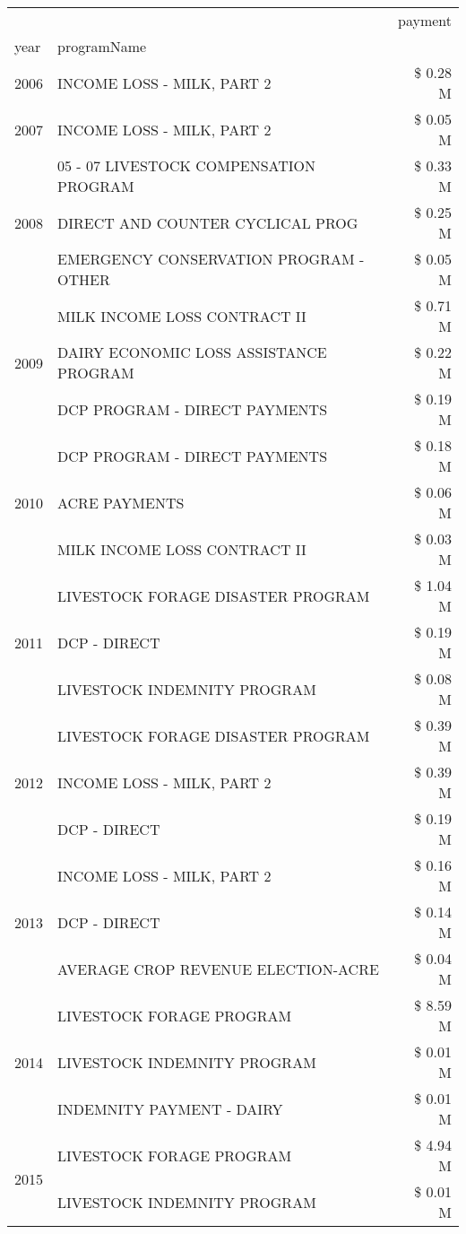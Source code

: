 \begin{tabular}{llr}
\toprule
 &  & payment \\
year & programName &  \\
\midrule
2006 & INCOME LOSS - MILK, PART 2 & \$ 0.28 M \\
\cline{1-3}
2007 & INCOME LOSS - MILK, PART 2 & \$ 0.05 M \\
\cline{1-3}
\multirow[t]{3}{*}{2008} & 05 - 07 LIVESTOCK COMPENSATION PROGRAM & \$ 0.33 M \\
 & DIRECT AND COUNTER CYCLICAL PROG & \$ 0.25 M \\
 & EMERGENCY CONSERVATION PROGRAM - OTHER & \$ 0.05 M \\
\cline{1-3}
\multirow[t]{3}{*}{2009} & MILK INCOME LOSS CONTRACT II & \$ 0.71 M \\
 & DAIRY ECONOMIC LOSS ASSISTANCE PROGRAM & \$ 0.22 M \\
 & DCP PROGRAM - DIRECT PAYMENTS & \$ 0.19 M \\
\cline{1-3}
\multirow[t]{3}{*}{2010} & DCP PROGRAM - DIRECT PAYMENTS & \$ 0.18 M \\
 & ACRE PAYMENTS & \$ 0.06 M \\
 & MILK INCOME LOSS CONTRACT II & \$ 0.03 M \\
\cline{1-3}
\multirow[t]{3}{*}{2011} & LIVESTOCK FORAGE DISASTER PROGRAM & \$ 1.04 M \\
 & DCP - DIRECT & \$ 0.19 M \\
 & LIVESTOCK INDEMNITY PROGRAM & \$ 0.08 M \\
\cline{1-3}
\multirow[t]{3}{*}{2012} & LIVESTOCK FORAGE DISASTER PROGRAM & \$ 0.39 M \\
 & INCOME LOSS - MILK, PART 2 & \$ 0.39 M \\
 & DCP - DIRECT & \$ 0.19 M \\
\cline{1-3}
\multirow[t]{3}{*}{2013} & INCOME LOSS - MILK, PART 2 & \$ 0.16 M \\
 & DCP - DIRECT & \$ 0.14 M \\
 & AVERAGE CROP REVENUE ELECTION-ACRE & \$ 0.04 M \\
\cline{1-3}
\multirow[t]{3}{*}{2014} & LIVESTOCK FORAGE PROGRAM & \$ 8.59 M \\
 & LIVESTOCK INDEMNITY PROGRAM & \$ 0.01 M \\
 & INDEMNITY PAYMENT - DAIRY & \$ 0.01 M \\
\cline{1-3}
\multirow[t]{3}{*}{2015} & LIVESTOCK FORAGE PROGRAM & \$ 4.94 M \\
 & LIVESTOCK INDEMNITY PROGRAM & \$ 0.01 M \\

\end{tabular}
